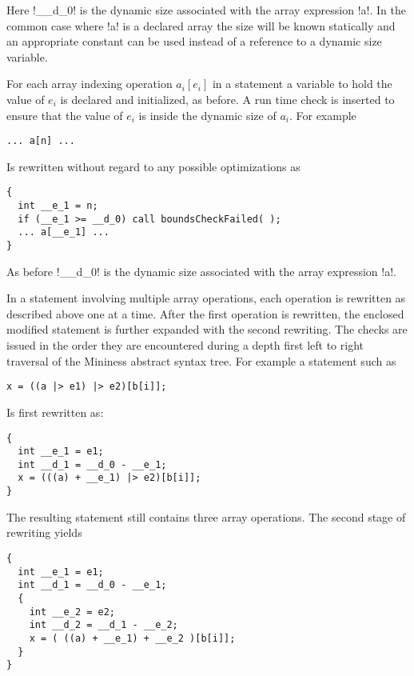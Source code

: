 Here !__d_0! is the dynamic size associated with the array expression !a!. In the common case
where !a! is a declared array the size will be known statically and an appropriate constant can
be used instead of a reference to a dynamic size variable.

For each array indexing operation $a_i[e_i]$ in a statement a variable to hold the value of
$e_i$ is declared and initialized, as before. A run time check is inserted to ensure that
the value of $e_i$ is inside the dynamic size of $a_i$. For example

\singlespace
\begin{lstlisting}[language=nesC]
... a[n] ...
\end{lstlisting}
\primaryspacing

Is rewritten without regard to any possible optimizations as

\singlespace
\begin{lstlisting}[language=nesC]
{
  int __e_1 = n;
  if (__e_1 >= __d_0) call boundsCheckFailed( );
  ... a[__e_1] ...
}
\end{lstlisting}
\primaryspacing

As before !__d_0! is the dynamic size associated with the array expression !a!.

In a statement involving multiple array operations, each operation is rewritten as described
above one at a time. After the first operation is rewritten, the enclosed modified statement is
further expanded with the second rewriting. The checks are issued in the order they are
encountered during a depth first left to right traversal of the Mininess abstract syntax tree.
For example a statement such as

\singlespace
\begin{lstlisting}[language=nesC]
x = ((a |> e1) |> e2)[b[i]];
\end{lstlisting}
\primaryspacing

Is first rewritten as:

\singlespace
\begin{lstlisting}[language=nesC]
{
  int __e_1 = e1;
  int __d_1 = __d_0 - __e_1;
  x = (((a) + __e_1) |> e2)[b[i]];
}
\end{lstlisting}
\primaryspacing

The resulting statement still contains three array operations. The second stage of rewriting
yields

\singlespace
\begin{lstlisting}[language=nesC]
{
  int __e_1 = e1;
  int __d_1 = __d_0 - __e_1;
  {
    int __e_2 = e2;
    int __d_2 = __d_1 - __e_2;
    x = ( ((a) + __e_1) + __e_2 )[b[i]];
  }
}
\end{lstlisting}
\primaryspacing

